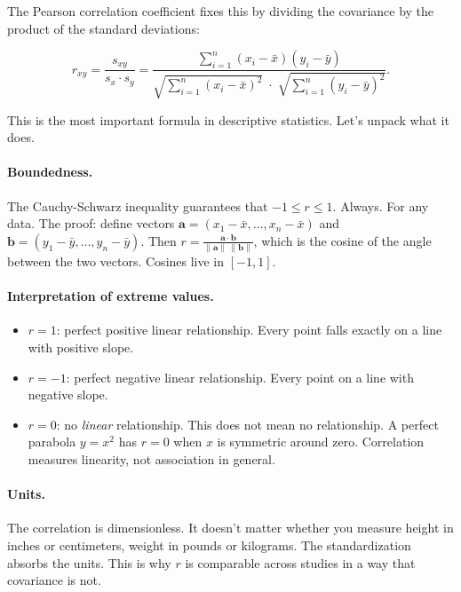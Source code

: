 The Pearson correlation coefficient fixes this by dividing the covariance by the product of the standard deviations:

\begin{equation}
\boxed{r_{xy} = \frac{s_{xy}}{s_x \cdot s_y} = \frac{\displaystyle\sum_{i=1}^{n}(x_i - \bar{x})(y_i - \bar{y})}{\sqrt{\displaystyle\sum_{i=1}^{n}(x_i - \bar{x})^2} \;\cdot\; \sqrt{\displaystyle\sum_{i=1}^{n}(y_i - \bar{y})^2}}.}
\label{eq:pearson-r}
\end{equation}

This is the most important formula in descriptive statistics. Let's unpack what it does.

\paragraph{Boundedness.} The Cauchy-Schwarz inequality guarantees that $-1 \leq r \leq 1$. Always. For any data. The proof: define vectors $\mathbf{a} = (x_1 - \bar{x}, \ldots, x_n - \bar{x})$ and $\mathbf{b} = (y_1 - \bar{y}, \ldots, y_n - \bar{y})$. Then $r = \frac{\mathbf{a} \cdot \mathbf{b}}{\|\mathbf{a}\|\,\|\mathbf{b}\|}$, which is the cosine of the angle between the two vectors. Cosines live in $[-1, 1]$.

\paragraph{Interpretation of extreme values.}
\begin{itemize}[nosep]
  \item $r = 1$: perfect positive linear relationship. Every point falls exactly on a line with positive slope.
  \item $r = -1$: perfect negative linear relationship. Every point on a line with negative slope.
  \item $r = 0$: no \emph{linear} relationship. This does not mean no relationship. A perfect parabola $y = x^2$ has $r = 0$ when $x$ is symmetric around zero. Correlation measures linearity, not association in general.
\end{itemize}

\paragraph{Units.} The correlation is dimensionless. It doesn't matter whether you measure height in inches or centimeters, weight in pounds or kilograms. The standardization absorbs the units. This is why $r$ is comparable across studies in a way that covariance is not.

